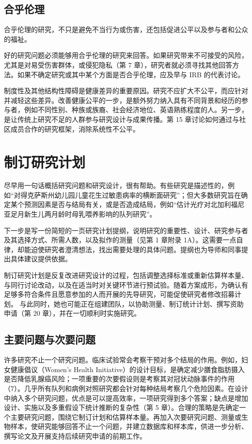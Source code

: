 \subsection{合乎伦理}
合乎伦理的研究，不只是避免不当行为或伤害，还包括促进公平以及参与者和公众的福祉。
\begin{description}[leftmargin=2em,labelindent=0pt,style=nextline]
\item[涉及人的研究。]好的研究问题必须能够用合乎伦理的研究来回答。如果研究带来不可接受的风险，尤其是对易受伤害群体，或侵犯隐私（第 7 章），研究者就必须寻找其他回答方法。如果不确定研究或其中某个方面是否合乎伦理，应及早与 IRB 的代表讨论。
\item[健康公平。]制度性及其他结构性障碍是健康差异的重要原因。研究不应扩大不公平，而应针对并减轻这些差异。改善健康公平的一步，是额外努力纳入具有不同背景和经历的参与者，例如不同性别、种族或族裔、社会经济地位、英语熟练程度的人。另一步，是让传统上研究不足的人群参与研究设计与成果传播。第 15 章讨论如何通过与社区成员合作的研究框架，消除系统性不公平。
\end{description}

\section{制订研究计划}
尽早用一句话概括研究问题和研究设计，很有帮助。有些研究是描述性的，例如“对得克萨斯州幼儿园儿童花生过敏患病率的横断面研究”；但大多数研究旨在确定某个预测因素是否与结局有关，或是否造成结局，例如“估计光疗对北加利福尼亚足月新生儿两月龄时母乳喂养影响的队列研究”。

下一步是写一份简短的一页研究计划提纲，说明研究的重要性、设计、研究参与者及其选择方式、所需人数，以及拟作的测量（见第 1 章附录 1A）。这需要一点自律，却能迫使研究者澄清想法，找出需要处理的具体问题。提纲也为导师和同事提出具体建议提供依据。

制订研究计划是反复改进研究设计的过程，包括调整选择标准或重新估算样本量、与同行讨论改动，以及在适当时对关键环节进行预试验。随着方案成形，为确认有足够多符合条件且愿意参加的人而开展的先导研究，可能促使研究者修改招募计划。
与此同时，她也可能正在组建团队，以协助测量、制订统计计划、撰写资助申请（第 20 章），并在一切顺利时实施研究。

\subsection{主要问题与次要问题}
许多研究不止一个研究问题。临床试验常会考察干预对多个结局的作用。例如，妇女健康倡议（Women’s Health Initiative）的设计目标，是确定减少膳食脂肪摄入是否降低乳腺癌风险；一项重要的次要假设则是考察其对冠状动脉事件的作用（7）。几乎所有队列和病例对照研究都会针对每种结局考察几个危险因素。在设计中纳入多个研究问题，优点是可以提高效率，一项研究得到多个答案；缺点是增加设计、实施以及多重假设下统计推断的复杂性（第 5 章）。合理的策略是先确定一个主要研究问题，围绕它制订计划和估算样本量。再加入次要研究问题、测量或生物样本，使研究能够回答不止一个问题，并建立数据库和样本库，供进一步分析、撰写论文及开展支持后续研究申请的前期工作。

